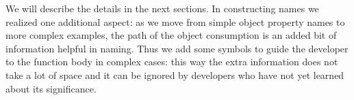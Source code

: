 \documentclass[10pt, preprint]{sigplanconf}
\begin{document}
We will describe the details in the next sections. In constructing names we realized one additional aspect: as we move from simple object property names to more complex examples, the path of the object consumption is an added bit of information helpful in naming. Thus we add some symbols to guide the developer to the function body in complex cases: this way the extra information does not take a lot of space and it can be ignored by developers who have not yet learned about its significance.


 
\end{document}
